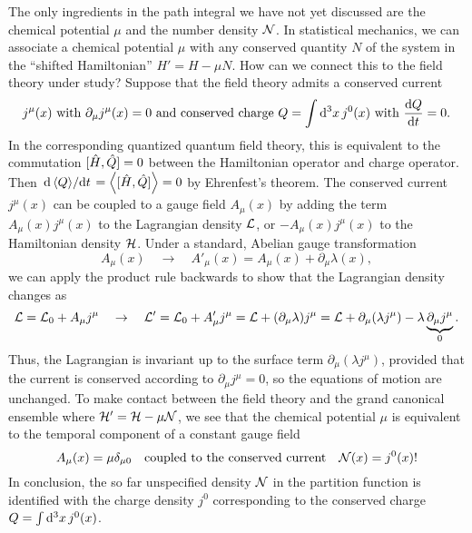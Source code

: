 The only ingredients in the path integral we have not yet discussed are the chemical potential $\mu$ and the number density $\mathcal{N}$.
In statistical mechanics, we can associate a chemical potential $\mu$ with any conserved quantity $N$ of the system in the ``shifted Hamiltonian'' $H' = H - \mu N$.
How can we connect this to the field theory under study?
Suppose that the field theory admits a conserved current
\begin{equation}
	j^\mu(x)
	\text{ with }
	\partial_\mu j^\mu(x) = 0
	\text{ and conserved charge }
	Q = \int \dif^3 x \, j^0(x)
	\text{ with }
	\odv{Q}{t} = 0.
\end{equation}
In the corresponding quantized quantum field theory, this is equivalent to the commutation $[ \hat{H} , \hat{Q} ] = 0$ between the Hamiltonian operator and charge operator.
Then $\odv{\thermalavg{Q}}/{t} = \thermalavg{\comm{\hat{H}}{\hat{Q}}} = 0$ by Ehrenfest's theorem.
The conserved current $j^\mu(x)$ can be coupled to a gauge field $A_\mu(x)$ by adding the term $A_\mu(x) j^\mu(x)$ to the Lagrangian density $\mathcal{L}$, or $-A_\mu(x) j^\mu(x)$ to the Hamiltonian density $\mathcal{H}$.
Under a standard, Abelian gauge transformation
\begin{equation}
	A_\mu(x) \quad \rightarrow \quad A'_\mu(x) = A_\mu(x) + \partial_\mu \lambda(x) ,
\label{eq:tft:gauge_transformation}
\end{equation}
we can apply the product rule backwards to show that the Lagrangian density changes as
\begin{equation}
	\mathcal{L} = \mathcal{L}_0 + A_\mu j^\mu \quad \rightarrow \quad \mathcal{L}' = \mathcal{L}_0 + A'_\mu j^\mu
	                                                             = \mathcal{L}   + (\partial_\mu \lambda) j^\mu
	                                                             = \mathcal{L}   + \partial_\mu (\lambda j^\mu) - \lambda \underbrace{\partial_\mu j^\mu}_0 .
\end{equation}
Thus, the Lagrangian is invariant up to the surface term $\partial_\mu (\lambda j^\mu)$, provided that the current is conserved according to $\partial_\mu j^\mu = 0$, so the equations of motion are unchanged.
To make contact between the field theory and the grand canonical ensemble where $\mathcal{H}' = \mathcal{H} - \mu \mathcal{N}$, we see that the chemical potential $\mu$ is equivalent to the temporal component of a constant gauge field
\begin{equation}
	A_\mu(x) = \mu \delta_{\mu 0} 
	\quad \text{coupled to the conserved current} \quad
	\mathcal{N}(x) = j^0(x)!
\label{eq:tft:chemical_potential}
\end{equation}
In conclusion, the so far unspecified density $\mathcal{N}$ in the partition function is identified with the charge density $j^0$ corresponding to the conserved charge $Q = \int \mathop{}\!\mathrm{d}^3 x \, j^0(x)$.

